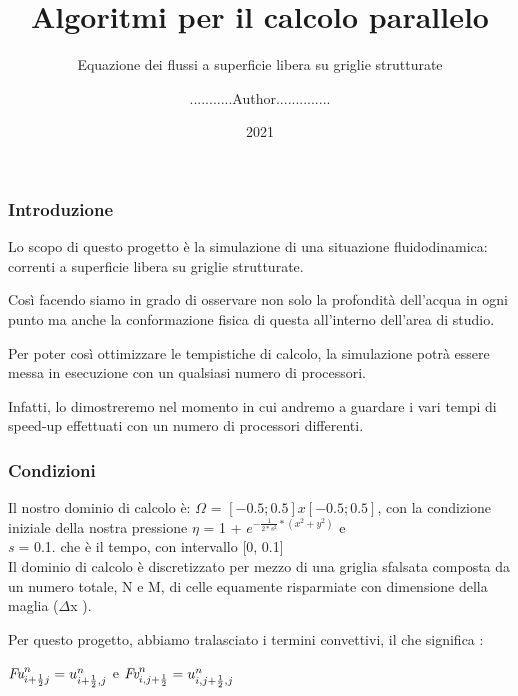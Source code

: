 \documentclass{beamer}
\title{Algoritmi per il calcolo parallelo}
\author{...........Author..............}
\date{2021}
\subtitle{Equazione dei flussi a superficie libera su griglie strutturate}
\begin{document}
	\frame{\titlepage}
	
	\begin{frame}
		\frametitle{Introduzione}
		Lo scopo di questo progetto è la simulazione di una situazione fluidodinamica: correnti a superficie libera su griglie strutturate.
		\medskip
	
		Così facendo siamo in grado di osservare non solo la profondità dell'acqua in ogni punto ma anche la conformazione fisica di questa all'interno dell'area di studio. 
		
		\medskip
		Per poter così ottimizzare le tempistiche di calcolo, la simulazione potrà essere messa in esecuzione con un qualsiasi numero di processori.
		
		\smallskip
		
		Infatti, lo dimostreremo nel momento in cui andremo a guardare i vari tempi di speed-up effettuati con un numero di processori differenti.
	
	\end{frame}

	\begin{frame}
		\frametitle{Condizioni}

		Il nostro dominio di calcolo è: $\Omega$ = $ [ -0.5; 0.5 ] x [ -0.5; 0.5 ]	$, con la condizione iniziale della nostra pressione $\eta$ =  1 + $e^{ -\frac{1}{2* s^{2}} * (x^{2} + y^{2})} $ e \\ \emph{s} = 0.1. che è il tempo, con intervallo [0, 0.1]\\
		
		
		Il dominio di calcolo è discretizzato per mezzo di una griglia sfalsata composta da un numero totale, N e M, di celle equamente risparmiate con dimensione della maglia ($\Delta$x ).
		
		
		Per questo progetto, abbiamo tralasciato i termini convettivi, il che significa : 
			\begin{center}
			
			$ \emph{Fu}_{i + \frac{1}{2} j}^{n} = u_{i+\frac{1}{2},j}^{n}	$ e $\emph{Fv}_{i,j + \frac{1}{2}} ^{n}	= u_{i, j +\frac{1}{2},j}^{n}	$
			
			\end{center}	
	\end{frame}
\end{document}
